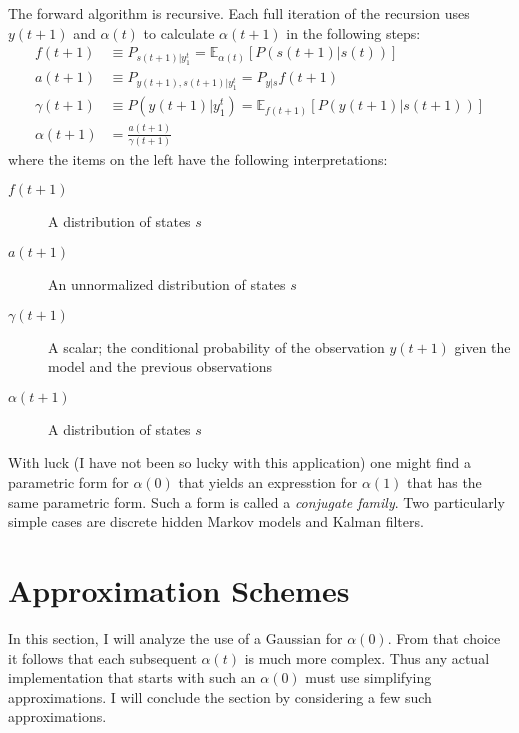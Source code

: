 \documentclass[12pt]{article}
\newcommand{\field}[1]{\mathbb{#1}}
\newcommand{\EV}[2]{\field{E}_{#1}\left[#2\right]}
\begin{document}
The forward algorithm is recursive.  Each full iteration of the
recursion uses $y(t+1)$ and $\alpha(t)$ to calculate $\alpha(t+1)$ in
the following steps:
\begin{subequations}
  \label{eq:Forward}
\begin{align}
  \label{eq:f1}
  f(t+1) &\equiv P_{s(t+1)|y_1^t} = \EV{\alpha(t)}{P(s(t+1)|s(t))} \\
  \label{eq:f2}
  a(t+1) &\equiv P_{y(t+1),s(t+1)|y_1^t} = P_{y|s} f(t+1) \\
  \label{eq:f3}
  \gamma(t+1) &\equiv P(y(t+1)|y_1^t) = \EV{f(t+1)}{P(y(t+1)|s(t+1))} \\
  \label{eq:f4}
  \alpha(t+1) &= \frac{a(t+1)}{\gamma(t+1)}
\end{align}
\end{subequations}
where the items on the left have the following interpretations:
\begin{description}
\item[$f(t+1)$] A distribution of states $s$
\item[$a(t+1)$] An unnormalized distribution of states $s$
\item[$\gamma(t+1)$] A scalar; the conditional probability of the
  observation $y(t+1)$ given the model and the previous observations
\item[$\alpha(t+1)$] A distribution of states $s$
\end{description}

With luck (I have not been so lucky with this application) one might
find a parametric form for $\alpha(0)$ that yields an expresstion for
$\alpha(1)$ that has the same parametric form.  Such a form is called
a \emph{conjugate family}.  Two particularly simple cases are discrete
hidden Markov models and Kalman filters.

\section{Approximation Schemes}
\label{sec:approximation}

In this section, I will analyze the use of a Gaussian for $\alpha(0)$.
From that choice it follows that each subsequent $\alpha(t)$ is much
more complex.  Thus any actual implementation that starts with such an
$\alpha(0)$ must use simplifying approximations.  I will conclude the
section by considering a few such approximations.
\end{document}
